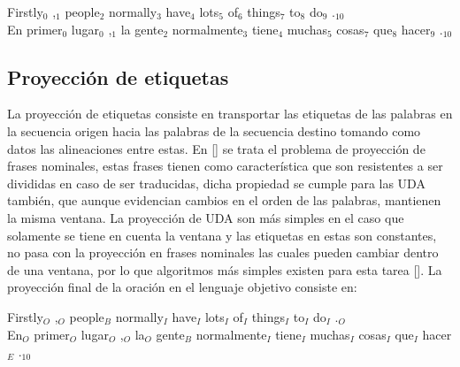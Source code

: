 \begin{adjustwidth}{25pt}{25pt}
	Firstly$_0$ ,$_1$ people$_2$ normally$_3$ have$_4$ lots$_5$ of$_6$ things$_7$ to$_8$ do$_9$ .$_{10}$ \\
	En primer$_0$ lugar$_0$ ,$_1$ la gente$_2$ normalmente$_3$ tiene$_4$ muchas$_5$ cosas$_7$ que$_8$ hacer$_9$ .$_{10}$
\end{adjustwidth}

\subsection{Proyección de etiquetas}

La proyección de etiquetas consiste en transportar las etiquetas de las palabras en la secuencia origen
hacia las palabras de la secuencia destino tomando como datos las alineaciones entre estas. En [\cite{yarowsky2001inducing}]
se trata el problema de proyección de frases nominales, estas frases tienen como característica que son resistentes
a ser divididas en caso de ser traducidas, dicha propiedad se cumple para las UDA también, que aunque evidencian 
cambios en el orden de las palabras, mantienen la misma ventana. La proyección de UDA son más simples en el caso
que solamente se tiene en cuenta la ventana y las etiquetas en estas son constantes, no pasa con la proyección en
frases nominales las cuales pueden cambiar dentro de una ventana, por lo que algoritmos más simples existen
para esta tarea [\cite{eger2018cross}]. La proyección final de la oración en el lenguaje objetivo consiste en:

\begin{adjustwidth}{25pt}{25pt}
	Firstly$_O$ ,$_O$ people$_B$ normally$_I$ have$_I$ lots$_I$ of$_I$ things$_I$ to$_I$ do$_I$ .$_O$ \\
	En$_O$ primer$_O$ lugar$_O$ ,$_O$ la$_O$ gente$_B$ normalmente$_I$ tiene$_I$ muchas$_I$ cosas$_I$ que$_I$ hacer$_E$ .$_{10}$
\end{adjustwidth}
